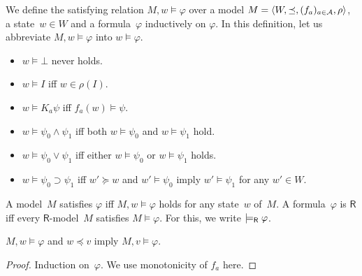  \begin{definition}
   We define the satisfying relation $M,w\models\varphi$ over a model
   $M = \langle{W,\preceq,(f_a)_{a\in \mathcal A},\rho}\rangle$, a state~$w\in W$ and a
   formula~$\varphi$ inductively on $\varphi$.
   In this definition, let
   us abbreviate $M,w\models \varphi$ into $w\models \varphi$\enspace.
   \newcommand{\m}{}
   \begin{itemize}
    \item $w\models \bot$ never holds.
    \item $w\models I$ iff
	  $w \in
	  \rho(I)$.
    \item	    $w\models K_a \psi$ iff
		    $f_a(w)\models \psi$.
    \item $w\models \psi_0\land\psi_1$ iff both
	  $w\models \psi_0$ and $w\models \psi_1$ hold.
    \item
	 $ w\models \psi_0\vee\psi_1$ iff either
	 $ w\models \psi_0$ or $w\models \psi_1$ holds.
    \item
	 $w\models \psi_0\supset\psi_1$ iff
	 $w'\succeq w$ and $w'\models \psi_0$ imply
	 $w'\models\psi_1$ for any $w'\in W$\enspace.
   \end{itemize}
  \end{definition}
  A model~$M$ satisfies $\varphi$ iff $M,w\models\varphi$ holds for any
  state~$w$ of~$M$.
  A formula~$\varphi$ is  $\mathsf R$ iff
  every $\mathsf R$-model~$M$ satisfies $M\models \varphi$.
  For this, we write $\models_{\mathsf R} \varphi$\enspace.

  \begin{proposition}
   \label{monot}
   $M,w\models\varphi$ and $w\preceq v$ imply
   $M,v\models\varphi$.
  \end{proposition}
  \begin{proof}
   Induction on~$\varphi$.
   We use monotonicity of $f_a$ here.
  \end{proof}

